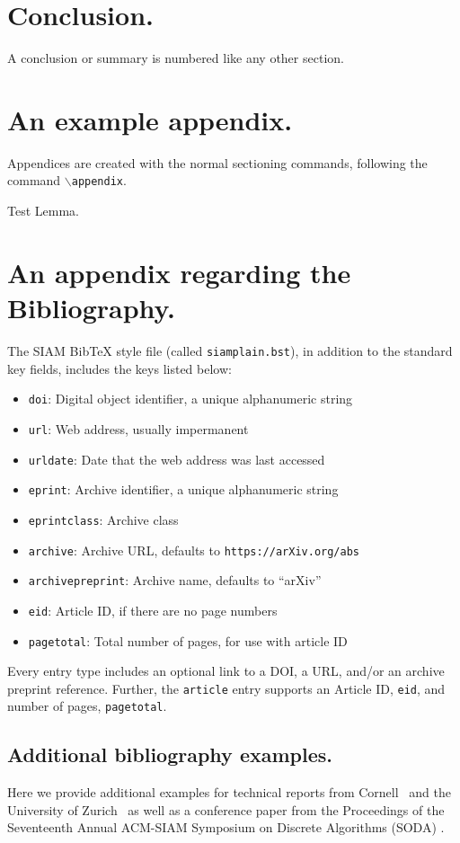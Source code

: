 \documentclass[twoside,leqno]{article}
\begin{document}
\section{Conclusion.}
A conclusion or summary is numbered like any other section.

\appendix
\section{An example appendix.} 
Appendices are created with the normal sectioning commands, following
the command $\backslash$\texttt{appendix}. 

\begin{lemma}
Test Lemma.
\end{lemma}

\section{An appendix regarding the Bibliography.}
\label{sec:bib}
The SIAM BibTeX style file (called \texttt{siamplain.bst}), in addition to the
standard key fields, includes the keys listed below:
\begin{itemize}[nosep]
\item \texttt{doi}: Digital object identifier, a unique alphanumeric string
\item \texttt{url}: Web address, usually impermanent
\item \texttt{urldate}: Date that the web address was last accessed
\item \texttt{eprint}: Archive identifier, a unique alphanumeric string
\item \texttt{eprintclass}: Archive class
\item \texttt{archive}: Archive URL, defaults to \nolinkurl{https://arXiv.org/abs}
\item \texttt{archivepreprint}: Archive name, defaults to ``arXiv''
\item \texttt{eid}: Article ID, if there are no page numbers
\item \texttt{pagetotal}: Total number of pages, for use with article ID
\end{itemize}
Every entry type includes an optional link to a DOI, a URL, and/or an archive 
preprint reference. Further, the \texttt{article} entry supports an Article ID, 
\texttt{eid}, and number of pages, \texttt{pagetotal}.

\subsection{Additional bibliography examples.}
Here we provide additional examples for technical reports from Cornell~\cite{Chew1989} and the University of Zurich~\cite{instance1290}
as well as a conference paper from the Proceedings of the Seventeenth Annual ACM-SIAM Symposium on Discrete Algorithms
(SODA) \cite{Aggarwal06}.
\end{document}
